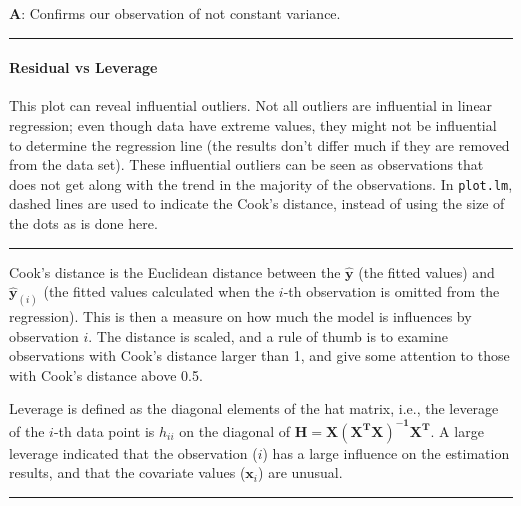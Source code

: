 \documentclass[]{article}
\let\oldparagraph\paragraph
\renewcommand{\paragraph}[1]{\oldparagraph{#1}\mbox{}}
\begin{document}
\textbf{A}: Confirms our observation of not constant variance.

\begin{center}\rule{0.5\linewidth}{\linethickness}\end{center}

\hypertarget{residual-vs-leverage}{%
\paragraph{Residual vs Leverage}\label{residual-vs-leverage}}

This plot can reveal influential outliers. Not all outliers are
influential in linear regression; even though data have extreme values,
they might not be influential to determine the regression line (the
results don't differ much if they are removed from the data set). These
influential outliers can be seen as observations that does not get along
with the trend in the majority of the observations. In \texttt{plot.lm},
dashed lines are used to indicate the Cook's distance, instead of using
the size of the dots as is done here.

\begin{center}\rule{0.5\linewidth}{\linethickness}\end{center}

Cook's distance is the Euclidean distance between the
\(\mathbf{\hat{y}}\) (the fitted values) and \(\mathbf{\hat{y}}_{(i)}\)
(the fitted values calculated when the \(i\)-th observation is omitted
from the regression). This is then a measure on how much the model is
influences by observation \(i\). The distance is scaled, and a rule of
thumb is to examine observations with Cook's distance larger than 1, and
give some attention to those with Cook's distance above 0.5.

Leverage is defined as the diagonal elements of the hat matrix, i.e.,
the leverage of the \(i\)-th data point is \(h_{ii}\) on the diagonal of
\(\mathbf{H = X(X^TX)^{-1}X^T}\). A large leverage indicated that the
observation (\(i\)) has a large influence on the estimation results, and
that the covariate values (\(\mathbf{x}_i\)) are unusual.

\begin{center}\rule{0.5\linewidth}{\linethickness}\end{center}

\footnotesize
\end{document}
